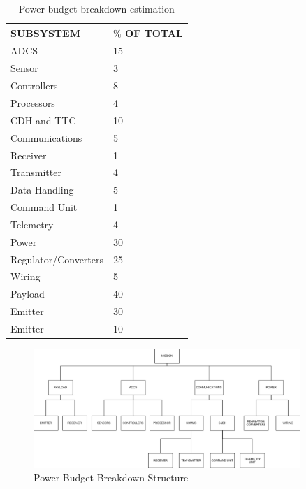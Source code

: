 \begin{table} [h]
\centering
\begin{tabular}{p{12cm} | l }
\textbf{SUBSYSTEM} & \textbf{$\%$ OF TOTAL} \\ \hline \hline
\ac{ADCS} & 15  \\
\hspace{1.0cm} Sensor & 3 \\
\hspace{1.0cm} Controllers & 8 \\
\hspace{1.0cm} Processors & 4 \\ 
\ac{CDH} and \ac{TTC} & 10  \\
\hspace{1.0cm} Communications & 5 \\
\hspace{1.0cm} \hspace{1.0cm} Receiver & 1 \\
\hspace{1.0cm} \hspace{1.0cm} Transmitter & 4 \\
\hspace{1.0cm} Data Handling & 5 \\ 
\hspace{1.0cm} \hspace{1.0cm} Command Unit & 1 \\
\hspace{1.0cm} \hspace{1.0cm} Telemetry & 4 \\
Power & 30 \\
\hspace{1.0cm} Regulator/Converters & 25 \\
\hspace{1.0cm} Wiring & 5 \\
Payload & 40\\
\hspace{1.0cm} Emitter & 30 \\
\hspace{1.0cm} Emitter & 10 \\
\end{tabular} 
\caption{Power budget breakdown estimation}
\label{epsbudgettable}
\end{table}

\begin{figure}
\centering
\includegraphics[width=0.9\textwidth, angle=90]{chapters/img/Power_budget_breakdown.jpg}
\caption{Power Budget Breakdown Structure}
\label{fig:powerbudget}
\end{figure}